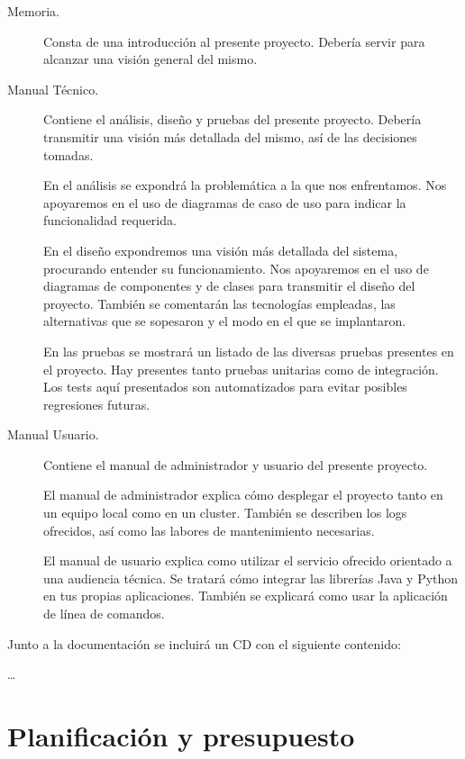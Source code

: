 \begin{description}

    \item[Memoria.] Consta de una introducción al presente
      proyecto. Debería servir para alcanzar una visión general del
      mismo.
    \item[Manual Técnico.] Contiene el análisis, diseño y pruebas del
      presente proyecto. Debería transmitir una visión más detallada
      del mismo, así de las decisiones tomadas.

      En el análisis se expondrá la problemática a la que nos
      enfrentamos. Nos apoyaremos en el uso de diagramas de caso de
      uso para indicar la funcionalidad requerida.

      En el diseño expondremos una visión más detallada del sistema,
      procurando entender su funcionamiento. Nos apoyaremos en el uso
      de diagramas de componentes y de clases para transmitir el
      diseño del proyecto. También se comentarán las tecnologías
      empleadas, las alternativas que se sopesaron y el modo en el que
      se implantaron.

      En las pruebas se mostrará un listado de las diversas pruebas
      presentes en el proyecto. Hay presentes tanto pruebas unitarias
      como de integración. Los tests aquí presentados son
      automatizados para evitar posibles regresiones futuras.

    \item[Manual Usuario.] Contiene el manual de administrador y
      usuario del presente proyecto.

      El manual de administrador explica cómo desplegar el proyecto
      tanto en un equipo local como en un cluster. También se
      describen los logs ofrecidos, así como las labores de
      mantenimiento necesarias.

      El manual de usuario explica como utilizar el servicio ofrecido
      orientado a una audiencia técnica. Se tratará cómo integrar las
      librerías Java y Python en tus propias aplicaciones. También se
      explicará como usar la aplicación de línea de comandos.
\end{description}

Junto a la documentación se incluirá un CD con el siguiente contenido:

\ldots{}


\section{Planificación y presupuesto}
